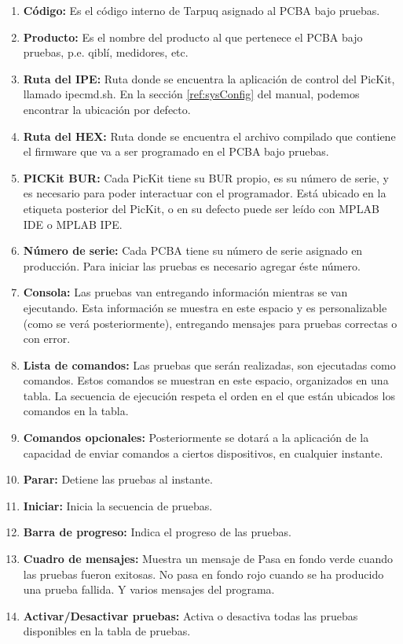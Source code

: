 \documentclass[a4paper,12pt]{refart}
\begin{document}
\begin{enumerate}
\item \textbf{Código:} Es el código interno de Tarpuq asignado al PCBA bajo pruebas.
\item \textbf{Producto:} Es el nombre del producto al que pertenece el PCBA bajo pruebas, p.e. qiblí, medidores, etc.
\item \textbf{Ruta del IPE:} Ruta donde se encuentra la aplicación de control del PicKit, llamado ipecmd.sh. En la sección \ref{ref:sysConfig} del manual, podemos encontrar la ubicación por defecto.
\item \textbf{Ruta del HEX:} Ruta donde se encuentra el archivo compilado que contiene el firmware que va a ser programado en el PCBA bajo pruebas.
\item \textbf{PICKit BUR:} Cada PicKit tiene su BUR propio, es su número de serie, y es necesario para poder interactuar con el programador. Está ubicado en la etiqueta posterior del PicKit, o en su defecto puede ser leído con MPLAB IDE o MPLAB IPE.
\item \textbf{Número de serie:} Cada PCBA tiene su número de serie asignado en producción. Para iniciar las pruebas es necesario agregar éste número.
\item \textbf{Consola:} Las pruebas van entregando información mientras se van ejecutando. Esta información se muestra en este espacio y es personalizable (como se verá posteriormente), entregando mensajes para pruebas correctas o con error.
\item \textbf{Lista de comandos:} Las pruebas que serán realizadas, son ejecutadas como comandos. Estos comandos se muestran en este espacio, organizados en una tabla. La secuencia de ejecución respeta el orden en el que están ubicados los comandos en la tabla.
\item \textbf{Comandos opcionales:} Posteriormente se dotará a la aplicación de la capacidad de enviar comandos a ciertos dispositivos, en cualquier instante.
\item \textbf{Parar:} Detiene las pruebas al instante.
\item \textbf{Iniciar:} Inicia la secuencia de pruebas.
\item \textbf{Barra de progreso:} Indica el progreso de las pruebas.
\item \textbf{Cuadro de mensajes:} Muestra un mensaje de Pasa en fondo verde cuando las pruebas fueron exitosas. No pasa en fondo rojo cuando se ha producido una prueba fallida. Y varios mensajes del programa.
\item \textbf{Activar/Desactivar pruebas:} Activa o desactiva todas las pruebas disponibles en la tabla de pruebas.
\end{enumerate}
\end{document}
